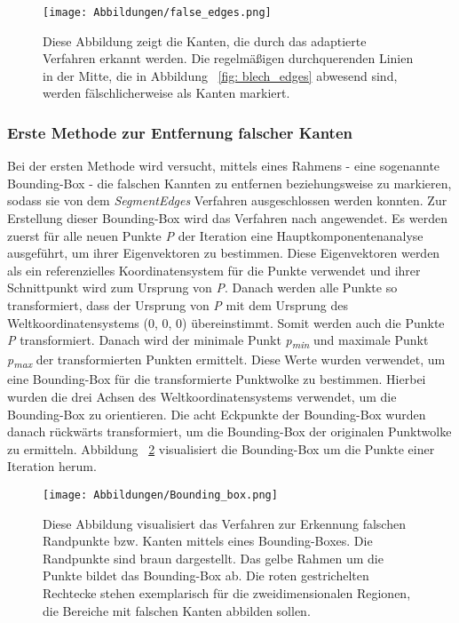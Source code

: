 \begin{figure}[h]
	\texttt{[image: Abbildungen/false\_edges.png]}
	\centering
	\caption{Diese Abbildung zeigt die Kanten, die durch das adaptierte Verfahren erkannt werden. Die regelmäßigen durchquerenden Linien in der Mitte, die in Abbildung ~\ref{fig: blech_edges} abwesend sind, werden fälschlicherweise als Kanten markiert. }
	\label{fig: false_edges}
\end{figure}

\subsubsection{Erste Methode zur Entfernung falscher Kanten}
Bei der ersten Methode wird versucht, mittels eines Rahmens - eine sogenannte Bounding-Box - die falschen Kannten zu entfernen beziehungsweise zu markieren, sodass sie von dem \textit{SegmentEdges} Verfahren ausgeschlossen werden konnten. Zur Erstellung dieser Bounding-Box wird das Verfahren nach \textcite{mccormick_find_2015} angewendet. Es werden zuerst für alle neuen Punkte \textit{P} der Iteration eine Hauptkomponentenanalyse ausgeführt, um ihrer Eigenvektoren zu bestimmen. Diese Eigenvektoren werden als ein referenzielles Koordinatensystem für die Punkte verwendet und ihrer Schnittpunkt wird zum Ursprung von \textit{P}. Danach werden alle Punkte so transformiert, dass der Ursprung von \textit{P} mit dem Ursprung des Weltkoordinatensystems (0, 0, 0) übereinstimmt. Somit werden auch die Punkte \textit{P} transformiert. Danach wird der minimale Punkt \textit{p\textsubscript{min}} und maximale Punkt \textit{p\textsubscript{max}} der transformierten Punkten ermittelt. Diese Werte wurden verwendet, um eine Bounding-Box für die transformierte Punktwolke zu bestimmen. Hierbei wurden die drei Achsen des Weltkoordinatensystems verwendet, um die Bounding-Box zu orientieren. Die acht Eckpunkte der Bounding-Box wurden danach rückwärts transformiert, um die Bounding-Box der originalen Punktwolke zu ermitteln. Abbildung ~\ref{fig: bounding_box} visualisiert die Bounding-Box um die Punkte einer Iteration herum.

\begin{figure}[h]
	\texttt{[image: Abbildungen/Bounding\_box.png]}
	\centering
	\caption{Diese Abbildung visualisiert das Verfahren zur Erkennung falschen Randpunkte bzw. Kanten mittels eines Bounding-Boxes. Die Randpunkte sind braun dargestellt. Das gelbe Rahmen um die Punkte bildet das Bounding-Box ab. Die roten gestrichelten Rechtecke stehen exemplarisch für die zweidimensionalen Regionen, die Bereiche mit falschen Kanten abbilden sollen.}
	\label{fig: bounding_box}
\end{figure}

